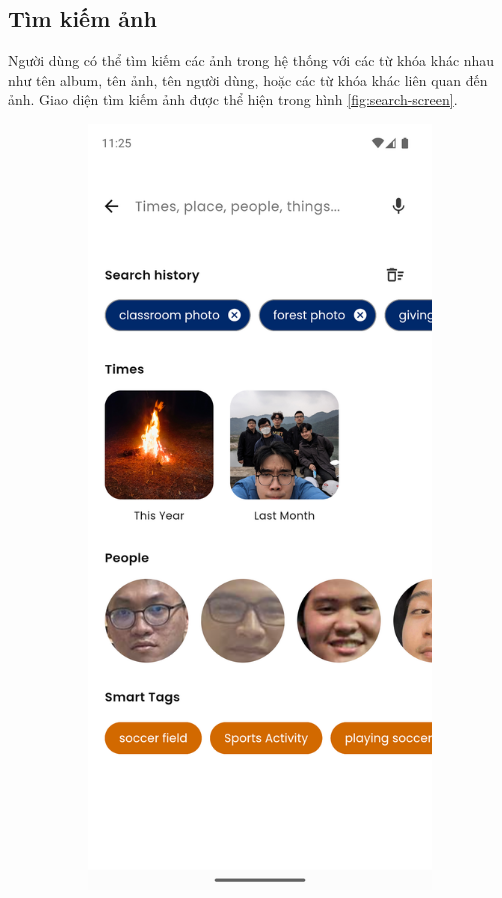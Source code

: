 \subsection{Tìm kiếm ảnh}

Người dùng có thể tìm kiếm các ảnh trong hệ thống với các từ khóa khác nhau như tên album, tên ảnh, tên người dùng, hoặc các từ khóa khác liên quan đến ảnh. Giao diện tìm kiếm ảnh được thể hiện trong hình \ref{fig:search-screen}. 

\begin{figure}[H]
    \centering
    \begin{subfigure}{0.32\textwidth}
        \includegraphics[width=1\linewidth]{figures/c4/4-2/search_1.png} 

\end{subfigure}
\end{figure}
